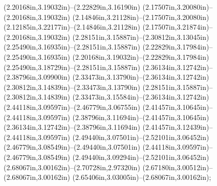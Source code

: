 (2.20168in,3.19032in)--(2.22829in,3.16190in) (2.17507in,3.20080in)--(2.20168in,3.19032in) (2.14846in,3.21128in)--(2.17507in,3.20080in) (2.12185in,3.22177in)--(2.14846in,3.21128in) (2.17507in,3.21874in)--(2.20168in,3.19032in) (2.28151in,3.15887in)--(2.30812in,3.13045in) (2.25490in,3.16935in)--(2.28151in,3.15887in) (2.22829in,3.17984in)--(2.25490in,3.16935in) (2.20168in,3.19032in)--(2.22829in,3.17984in) (2.25490in,3.18729in)--(2.28151in,3.15887in) (2.36134in,3.12742in)--(2.38796in,3.09900in) (2.33473in,3.13790in)--(2.36134in,3.12742in) (2.30812in,3.14839in)--(2.33473in,3.13790in) (2.28151in,3.15887in)--(2.30812in,3.14839in) (2.33473in,3.15584in)--(2.36134in,3.12742in) (2.44118in,3.09597in)--(2.46779in,3.06755in) (2.41457in,3.10645in)--(2.44118in,3.09597in) (2.38796in,3.11694in)--(2.41457in,3.10645in) (2.36134in,3.12742in)--(2.38796in,3.11694in) (2.41457in,3.12439in)--(2.44118in,3.09597in) (2.49440in,3.07501in)--(2.52101in,3.06452in) (2.46779in,3.08549in)--(2.49440in,3.07501in) (2.44118in,3.09597in)--(2.46779in,3.08549in) (2.49440in,3.09294in)--(2.52101in,3.06452in) (2.68067in,3.00162in)--(2.70728in,2.97320in) (2.67180in,3.00512in)--(2.68067in,3.00162in) (2.65406in,3.03005in)--(2.68067in,3.00162in);
